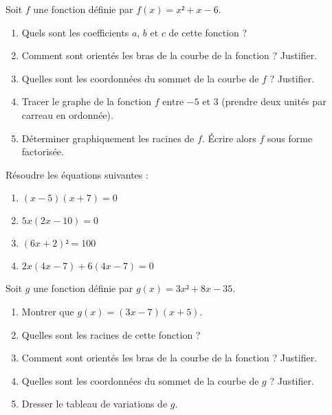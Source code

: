 \documentclass[
	classe=$1^{ere}STI2D$,
	headerTitle=Devoir\space maison
]{évaluation}
\begin{document}
\begin{exercice}
	Soit $f$ une fonction définie par $f(x) = x² + x - 6$.
	\begin{enumerate}
		\item Quels sont les coefficients $a$, $b$ et $c$ de cette fonction ?
		\item Comment sont orientés les bras de la courbe de la fonction ? Justifier.
		\item Quelles sont les coordonnées du sommet de la courbe de $f$ ? Justifier.
		\item Tracer le graphe de la fonction $f$ entre $-5$ et $3$ (prendre deux unités par carreau en ordonnée).
		\item Déterminer graphiquement les racines de $f$. Écrire alors $f$ sous forme factorisée.
	\end{enumerate}
\end{exercice}

\begin{exercice}
	Résoudre les équations suivantes :
	\begin{enumerate}
		\item $(x - 5)(x + 7) = 0$
		\item $5x(2x - 10) = 0$
		\item $(6x + 2)² = 100$
		\item $2x(4x - 7) + 6(4x - 7) = 0$
	\end{enumerate}
\end{exercice}

\begin{exercice}
	Soit $g$ une fonction définie par $g(x) = 3x² + 8x - 35$.
	\begin{enumerate}
		\item Montrer que $g(x) = (3x - 7)(x + 5)$.
		\item Quelles sont les racines de cette fonction ?
		\item Comment sont orientés les bras de la courbe de la fonction ? Justifier.
		\item Quelles sont les coordonnées du sommet de la courbe de $g$ ? Justifier.
		\item Dresser le tableau de variations de $g$.
	\end{enumerate}
\end{exercice}
\end{document}

